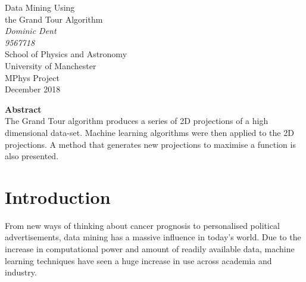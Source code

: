 \documentclass[a4paper,11pt,twoside]{article}
\begin{document}
\pagestyle{myStylePage}




\begin{titlepage} %
\begin{center} %


{\Huge Data Mining Using}\\[0.4cm]
{\Huge the Grand Tour Algorithm}\\[0.8cm] %
\textit{Dominic Dent}~\\[0.3cm] %
\textit{9567718}~\\[0.3cm]
School of Physics and Astronomy~\\[0.3cm]
University of Manchester~\\[0.3cm]
MPhys Project~\\[0.3cm]
December 2018~\\[2cm]

\vfill
\end{center}

{\Large \textbf{Abstract}}~\\[0.3cm]
The Grand Tour algorithm produces a series of 2D projections of a high dimensional data-set. Machine learning algorithms were then applied to the 2D projections. A method that generates new projections to maximise a function is also presented.

\end{titlepage}
\clearpage
{} %
\setcounter{page}{2} %

\newpage %
\tableofcontents

\newpage

\section{Introduction}

From new ways of thinking about cancer prognosis to personalised political advertisements, data mining has a massive influence in today’s world. Due to the increase in computational power and amount of readily available data, machine learning techniques have seen a huge increase in use across academia and industry. 
\newline
\end{document}
